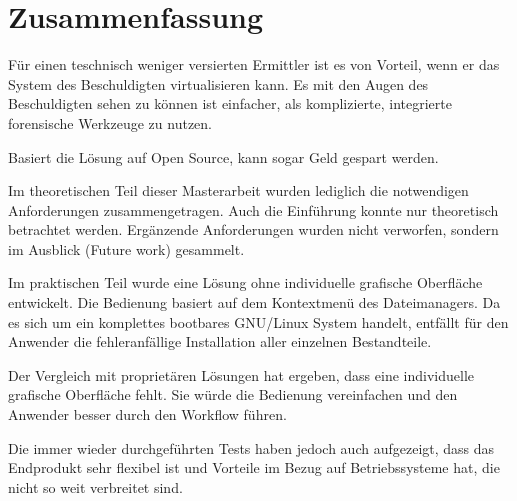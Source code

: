 \chapter*{Zusammenfassung}

Für einen teschnisch weniger versierten Ermittler ist es von Vorteil, wenn er das System des Beschuldigten virtualisieren kann. Es mit den Augen des Beschuldigten sehen zu können ist einfacher, als komplizierte, integrierte forensische Werkzeuge zu nutzen.

Basiert die Lösung auf Open Source, kann sogar Geld gespart werden.

Im theoretischen Teil dieser Masterarbeit wurden lediglich die notwendigen Anforderungen zusammengetragen. Auch die Einführung konnte nur theoretisch betrachtet werden. Ergänzende Anforderungen wurden nicht verworfen, sondern im Ausblick (Future work) gesammelt.

Im praktischen Teil wurde eine Lösung ohne individuelle grafische Oberfläche entwickelt. Die Bedienung basiert auf dem Kontextmenü des Dateimanagers. Da es sich um ein komplettes bootbares GNU/Linux System handelt, entfällt für den Anwender die fehleranfällige Installation aller einzelnen Bestandteile.

Der Vergleich mit proprietären Lösungen hat ergeben, dass eine individuelle grafische Oberfläche fehlt. Sie würde die Bedienung vereinfachen und den Anwender besser durch den Workflow führen.

Die immer wieder durchgeführten Tests haben jedoch auch aufgezeigt, dass das Endprodukt sehr flexibel ist und Vorteile im Bezug auf Betriebssysteme hat, die nicht so weit verbreitet sind.